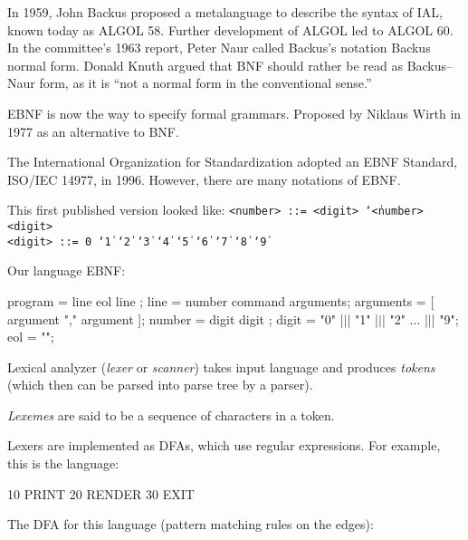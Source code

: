 \documentclass{article}
\begin{document}

\pptToc


In 1959, John Backus proposed a metalanguage to describe the syntax of IAL, known today as ALGOL 58. Further development of ALGOL led to ALGOL 60. In the committee's 1963 report, Peter Naur called Backus's notation Backus normal form. Donald Knuth argued that BNF should rather be read as Backus–Naur form, as it is ``not a normal form in the conventional sense.''

EBNF is now the way to specify formal grammars. Proposed by Niklaus Wirth in 1977 as an alternative to BNF.

The International Organization for Standardization adopted an EBNF Standard, ISO/IEC 14977, in 1996. However, there are many notations of EBNF.
\plush{}

This first published version looked like:
\texttt{<number> ::= <digit> \char`\| <number> <digit> \\
<digit> ::= 0 \char`\| 1 \char`\| 2 \char`\| 3 \char`\| 4 \char`\| 5 \char`\| 6 \char`\| 7 \char`\| 8 \char`\| 9}
\plush{}

Our language EBNF:
\begin{ffcode}
program = line { eol line };
line = number command arguments;
arguments = [ argument { "," argument } ];
number = digit { digit };
digit = "0" |$\vert$| "1" |$\vert$| "2" ... |$\vert$| "9";
eol = "\n";
\end{ffcode}
\plush{}


Lexical analyzer (\emph{lexer} or \emph{scanner}) takes input language and produces \emph{tokens} (which then can be parsed into parse tree by a parser).

\emph{Lexemes} are said to be a sequence of characters in a token.
\plush{}

Lexers are implemented as DFAs, which use regular expressions. For example, this is the language:
\begin{ffcode}
10 PRINT
20 RENDER
30 EXIT
\end{ffcode}
\plush{}

The DFA for this language (pattern matching rules on the edges): \\
\end{document}

